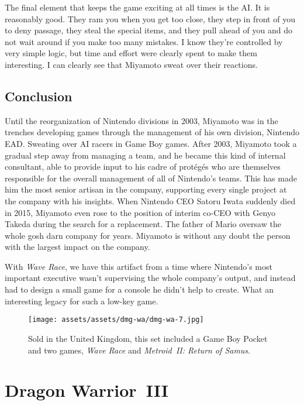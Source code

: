 \documentclass{book}
\begin{document}
The final element that keeps the game exciting at all times is the AI. It is reasonably good. They ram you when you get too close, they step in front of you to deny passage, they steal the special items, and they pull ahead of you and do not wait around if you make too many mistakes. I know they’re controlled by very simple logic, but time and effort were clearly spent to make them interesting. I can clearly see that Miyamoto sweat over their reactions.

\FloatBarrier\needspace{10mm}\section*{Conclusion}\nopagebreak[4]

Until the reorganization of Nintendo divisions in 2003, Miyamoto was in the trenches developing games through the management of his own division, Nintendo EAD. Sweating over AI racers in Game Boy games. After 2003, Miyamoto took a gradual step away from managing a team, and he became this kind of internal consultant, able to provide input to his cadre of protégés who are themselves responsible for the overall management of all of Nintendo’s teams. This has made him the most senior artisan in the company, supporting every single project at the company with his insights. When Nintendo CEO Satoru Iwata suddenly died in 2015, Miyamoto even rose to the position of interim co-CEO with Genyo Takeda during the search for a replacement. The father of Mario oversaw the whole gosh darn company for years. Miyamoto is without any doubt the person with the largest impact on the company.

With \emph{Wave Race}, we have this artifact from a time where Nintendo’s most important executive wasn’t supervising the whole company’s output, and instead had to design a small game for a console he didn’t help to create. What an interesting legacy for such a low-key game.

\begin{figure}[hbt]
\vskip 10pt
\centering \texttt{[image: assets/assets/dmg-wa/dmg-wa-7.jpg]}\par\pagetwodescription Sold in the United Kingdom, this set included a Game Boy Pocket and two games, \emph{Wave Race} and \emph{Metroid II: Return of Samus}.
\vskip 6pt
\end{figure}


\begingroup \chapter*{Dragon Warrior III} \endgroup
\end{document}
